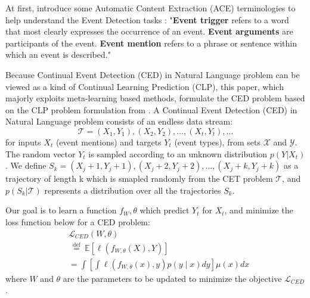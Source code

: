 At first, introduce some Automatic Content Extraction (ACE) terminologies to help understand the Event Detection tasks \citep{cao2020incremental}: "\textbf{Event trigger} refers to a word that most clearly expresses the occurrence of an event. \textbf{Event arguments} are participants of the event. \textbf{Event mention} refers to a phrase or sentence within which an event is described."

Because Continual Event Detection (CED) in Natural Language problem can be viewed as a kind of Continual Learning Prediction (CLP), this paper, which majorly exploits meta-learning based methods, formulate the CED problem based on the CLP problem formulation from \citet{javed2019meta}.
A Continual Event Detection (CED) in Natural Language problem consists of an endless data stream:
\[\mathcal{T} = (X_1, Y_1), (X_2, Y_2), \dots, (X_t, Y_t), \dots\]
for inputs $X_t$ (event mentions) and targets $Y_t$ (event types), from sets $\mathcal{X}$ and $\mathcal{Y}$. The random vector $Y_t$ is sampled
according to an unknown distribution $p(Y|X_t)$. We define $S_k = (X_j+1, Y_j+1), (X_j+2, Y_j+2), \dots, (X_j+k, Y_j+k)$ as a trajectory of length k which is smapled randomly from the CET problem $\mathcal{T}$, and $p(S_k|\mathcal{T})$ represents a distribution over all the trajectories $S_k$.

Our goal is to learn a function $f_W,\theta$ which predict $Y_t$ for $X_t$, and minimize the loss function below for a CED problem:
\begin{equation}
    \begin{split}
    &\mathcal{L}_{C E D}(W, \theta)  \\
    &\stackrel{\text { def }}{=}  \mathbb{E}\left[\ell\left(f_{W, \theta}(X), Y\right)\right] \\ 
    & =\int\left[\int \ell\left(f_{W, \theta}(x), y\right) p(y \mid x) d y\right] \mu(x) d x
    \end{split}
\end{equation}
where $W$ and $\theta$ are the parameters to be updated to minimize the objective $\mathcal{L}_{C E D}$.
